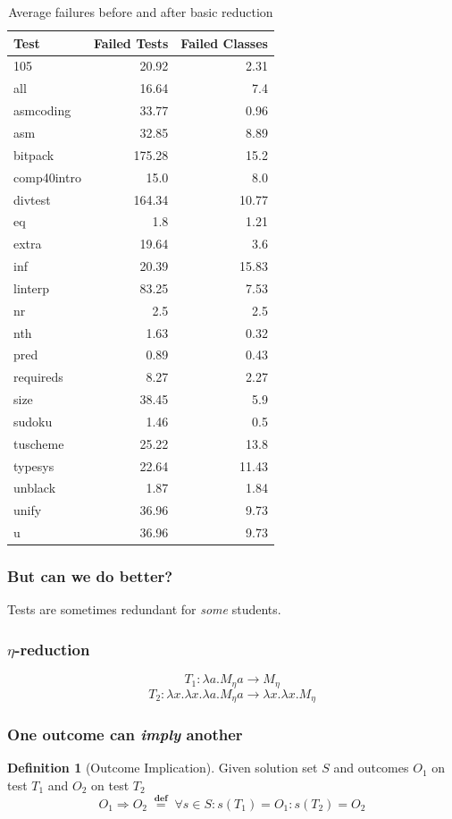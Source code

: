 \documentclass[svgnames,14pt]{beamer}
\newcommand\defined{\mathrel{\;\stackrel{\scriptscriptstyle\mathbf{def}}{=}\;}}
\theoremstyle{definition}
\newtheorem{defn}{Definition}
\begin{document}
\begin{frame}
\begin{table}[t]
\def\?{\phantom0}
\centering
\fontsize{8}{3}\selectfont
\begin{tabular}{ | l | r | r |}
\hline
Test & Failed Tests & Failed Classes \\
\hline
105 & 20.92 & 2.31 \\
all & 16.64 & 7.4 \\
asmcoding & 33.77 & 0.96 \\
asm & 32.85 & 8.89 \\
bitpack & 175.28 & 15.2 \\
comp40intro & 15.0 & 8.0 \\
divtest & 164.34 & 10.77 \\
eq & 1.8 & 1.21 \\
extra & 19.64 & 3.6 \\
inf & 20.39 & 15.83 \\
linterp & 83.25 & 7.53 \\
nr & 2.5 & 2.5 \\
nth & 1.63 & 0.32 \\
pred & 0.89 & 0.43 \\
requireds & 8.27 & 2.27 \\
size & 38.45 & 5.9 \\
sudoku & 1.46 & 0.5 \\
tuscheme & 25.22 & 13.8 \\
typesys & 22.64 & 11.43 \\
unblack & 1.87 & 1.84 \\
unify & 36.96 & 9.73 \\
u & 36.96 & 9.73 \\
\hline
\end{tabular}
\caption{Average failures before and after basic reduction}
\end{table}
\end{frame}

\begin{frame}
\frametitle{But can we do better?}
Tests are sometimes redundant for \emph{some} students.
\end{frame}

\begin{frame}
\frametitle{$\eta$-reduction}
$$T_1 : \lambda a.M_\eta a \longrightarrow M_\eta$$
$$T_2 : \lambda x.\lambda x.\lambda a.M_\eta a \longrightarrow \lambda x.\lambda x.M_\eta$$
\end{frame}

\begin{frame}
\frametitle{One outcome can \emph{imply} another}
\begin{defn}[Outcome Implication]
Given solution set $S$ and outcomes $O_1$ on test $T_1$ and $O_2$ on test $T_2$
$$O_1 \Rightarrow O_2 \defined \forall s \in S : s(T_1) = O_1 : s(T_2) = O_2$$
\end{defn}
\end{frame}
\end{document}

